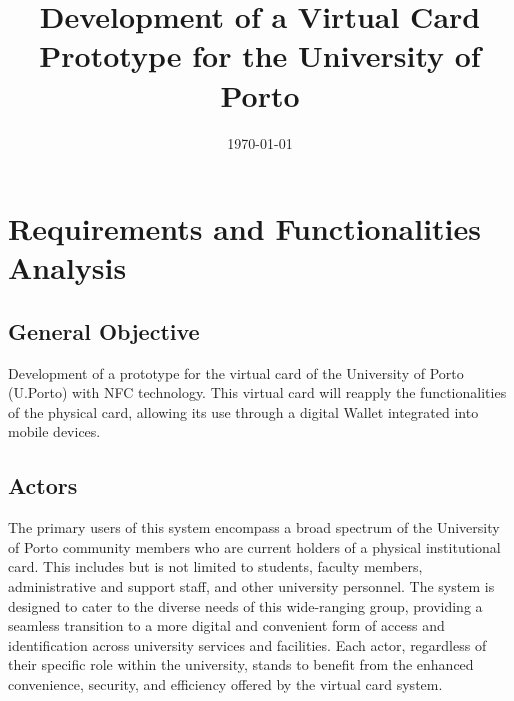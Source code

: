 \documentclass[10pt]{article}
\title{\vspace{-3cm}Development of a Virtual Card Prototype for the University of Porto}
\date{\today}
\begin{document}
\maketitle

\section{Requirements and Functionalities Analysis}

\subsection{General Objective}
Development of a prototype for the virtual card of the University of Porto (U.Porto) with NFC technology. This virtual card will reapply the functionalities of the physical card, allowing its use through a digital Wallet integrated into mobile devices.

\subsection{Actors}
The primary users of this system encompass a broad spectrum of the University of Porto community members who are current holders of a physical institutional card. This includes but is not limited to students, faculty members, administrative and support staff, and other university personnel. The system is designed to cater to the diverse needs of this wide-ranging group, providing a seamless transition to a more digital and convenient form of access and identification across university services and facilities. Each actor, regardless of their specific role within the university, stands to benefit from the enhanced convenience, security, and efficiency offered by the virtual card system.
\end{document}
